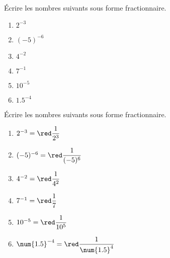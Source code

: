 \begin{exercice*}
    Écrire les nombres suivants sous forme fractionnaire.
    \begin{multicols}{2}
        \begin{spacing}{1.5}
            \begin{enumerate}
                \item $2^{-3}$
                \item $(-5)^{-6}$
                \item $4^{-2}$
                \item $7^{-1}$
                \item $10^{-5}$
                \item $\num{1.5}^{-4}$
            \end{enumerate}
        \end{spacing}
    \end{multicols}
\end{exercice*}
\begin{corrige}
    Écrire les nombres suivants sous forme fractionnaire.
    \begin{multicols}{2}        
            \begin{enumerate}
                \item $2^{-3}           ={\red \dfrac{1}{2^3}           }$
                \item $(-5)^{-6}        ={\red \dfrac{1}{(-5)^6}        }$
                \item $4^{-2}           ={\red \dfrac{1}{4^2}           }$
                \item $7^{-1}           ={\red \dfrac{1}{7}             }$
                \item $10^{-5}          ={\red \dfrac{1}{10^5}          }$
                \item $\num{1.5}^{-4}   ={\red \dfrac{1}{\num{1.5}^4}   }$
            \end{enumerate}        
    \end{multicols}
\end{corrige}

